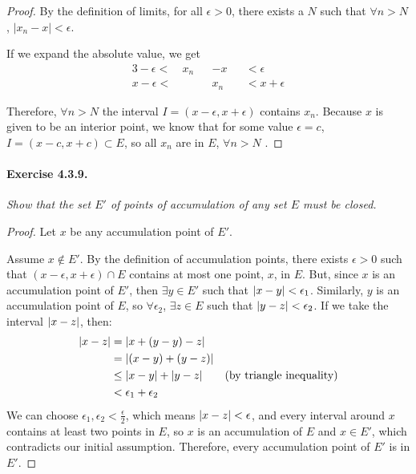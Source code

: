 \documentclass[11pt]{article}
\DeclarePairedDelimiter{\abs}{\lvert}{\rvert}
\begin{document}
\begin{proof}
	By the definition of limits, for all $\epsilon > 0$, there exists a $N$ such that $\forall n > N$, $|x_n - x| < \epsilon$. 
	
	If we expand the absolute value, we get 
	\begin{alignat*}{3}
		-\epsilon <\ &x_n &&- x &&< \epsilon \\
		x - \epsilon < & &&x_n  &&< x + \epsilon
	\end{alignat*}
	
	Therefore, $\forall n > N$ the interval $I = (x - \epsilon, x + \epsilon)$ contains $x_n$. Because $x$ is given to be an interior point, we know that for some value $\epsilon = c$, $I = (x - c, x + c) \subset E$, so all $x_n$ are in $E$, $\forall n > N$ . 
	
\end{proof}

 
\paragraph{Exercise 4.3.9.} \textit{Show that the set $E'$ of points of accumulation of any set $E$ must be closed.}

\begin{proof}
Let $x$ be any accumulation point of $E'$. 

Assume $x \notin E'$. By the definition of accumulation points, there exists $\epsilon > 0$ such that $(x - \epsilon, x + \epsilon) \cap E$ contains at most one point, $x$, in $E$. But, since $x$ is an accumulation point of $E'$, then $\exists y \in E'$ such that $\abs{x - y} < \epsilon_1$. Similarly, $y$ is an accumulation point of $E$, so $\forall \epsilon_2$, $\exists z \in E$ such that $\abs{y - z} < \epsilon_2$. If we take the interval $\abs{x - z}$, then:
\begin{align*}
	\abs{x - z} &= \abs{x + (y - y) - z} \\
				&= \abs{(x - y) + (y - z)} \\
				&\leq \abs{x - y} + \abs{y - z} \tag{by triangle inequality} \\
				&< \epsilon_1 + \epsilon_2
\end{align*}
We can choose $\epsilon_1, \epsilon_2 < \frac{\epsilon}{2}$, which means $\abs{x - z} < \epsilon$, and every interval around $x$ contains at least two points in $E$, so $x$ is an accumulation of $E$ and $x \in E'$, which contradicts our initial assumption. Therefore, every accumulation point of $E'$ is in $E'$.

\end{proof}
\end{document}
